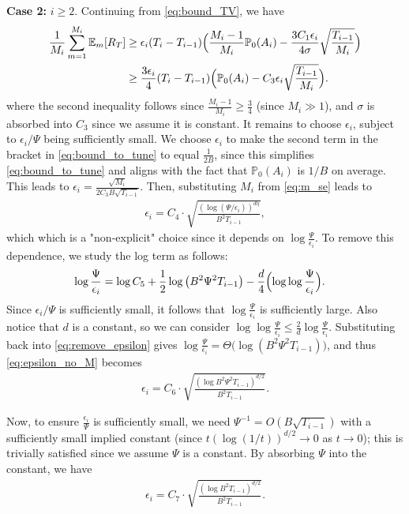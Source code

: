 \documentclass[10pt]{article}
\begin{document}
\textbf{Case 2:} $i\geq 2$. 
Continuing from \eqref{eq:bound_TV}, we have
\begin{align}
    \frac{1}{M_i}\sum_{m=1}^{M_i}\mathbb{E}_m[R_T]
    & \geq \epsilon_i(T_i-T_{i-1})\Bigl(\frac{M_i-1}{M_i}\mathbb{P}_0(A_i)-\frac{3C_1\epsilon_i}{4\sigma}  \sqrt{\frac{T_{i-1}}{M_i}}\Bigr) \\
    & \geq \frac{3\epsilon_i}{4}(T_i-T_{i-1}) \Bigl(\mathbb{P}_0(A_i)- C_{3}\epsilon_i \sqrt{\frac{T_{i-1}}{M_i}}\Bigr). \label{eq:bound_to_tune}
\end{align}
where the second inequality follows since $\frac{M_i-1}{M_i} \geq \frac{3}{4}$ (since $M_i \gg 1$), and $\sigma$ is absorbed into $C_{3}$ since we assume it is constant.
It remains to choose $\epsilon_i$, subject to $\epsilon_i/\Psi$ being sufficiently small.
We choose $\epsilon_i$ to make the second term in the bracket in \eqref{eq:bound_to_tune} to equal $\frac{1}{2B}$, since this simplifies \eqref{eq:bound_to_tune} and aligns with the fact that $\mathbb{P}_0(A_i)$ is $1/B$ on average.
This leads to $\epsilon_i = \frac{\sqrt{M_i}}{2C_3 B\sqrt{T_{i-1}}}$. Then, substituting $M_i$ from \eqref{eq:m_se} leads to
\begin{align}
    \epsilon_i = C_{4} \cdot \sqrt{\frac{(\log(\Psi/\epsilon_i))^{d\eta}}{B^2T_{i-1}}},  \label{eq:epsilon_no_M}
\end{align}
which which is a "non-explicit" choice since it depends on $\log\frac{\Psi}{\epsilon_i}$. To remove this dependence, we study the log term as follows:
\begin{align}
    \log \frac{\Psi}{\epsilon_i}
    & = \log C_{5} + \frac{1}{2} \log \left( B^2\Psi^2T_{i-1} \right) - \frac{d}{4} \Bigl(\log \log\frac{\Psi}{\epsilon_i}\Bigr). \label{eq:remove_epsilon}
\end{align}
Since $\epsilon_i / \Psi$ is sufficiently small, it follows that $\log \frac{\Psi}{\epsilon_i}$ is sufficiently large. Also notice that $d$ is a constant, so we can consider $\log \log \frac{\Psi}{\epsilon_i} \leq \frac{2}{d}\log \frac{\Psi}{\epsilon_i}$. Substituting back into \eqref{eq:remove_epsilon} gives $\log\frac{\Psi}{\epsilon_i}= \Theta\bigl(\log (B^2\Psi^2T_{i-1}) \bigr)$, and thus \eqref{eq:epsilon_no_M} becomes
\begin{align}
    \epsilon_i 
    = C_{6} \cdot \sqrt{\frac{(\log B^2 \Psi^2 T_{i-1})^{d/2}}{B^2T_{i-1}}}.
\end{align}

Now, to ensure $\frac{\epsilon_i}{\Psi}$ is sufficiently small, we need $\Psi^{-1} =O(B\sqrt{T_{i-1}}) $ with a sufficiently small implied constant (since $t (\log (1/t))^{d/2} \to 0$ as $t \to 0$); this is trivially satisfied since we assume $\Psi$ is a constant. By absorbing $\Psi$ into the constant, we have
\begin{align}
    \epsilon_i 
    = C_{7} \cdot \sqrt{\frac{(\log B^2 T_{i-1})^{d/2}}{B^2T_{i-1}}}. \label{eq:epsilon_value}
\end{align}
\end{document}
